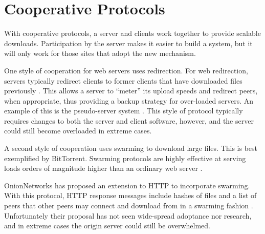 
\section{Cooperative Protocols}

With cooperative protocols, a server and clients work together to provide scalable downloads.  Participation by the server makes it easier to build a system,
but it will only work for those sites that adopt the new mechanism.  

One style of cooperation for web servers uses redirection.  For web redirection, servers typically redirect clients to former clients that have downloaded files previously \cite{pseudoserving, coopnet}.  This allows a server to ``meter'' its upload speeds and redirect peers, when appropriate, thus providing a backup strategy for over-loaded servers.  An example of this is the pseudo-server system \cite{pseudoserving}.  This style of protocol typically requires changes to both the server and client software, however, and the server could still become overloaded in extreme cases.

A second style of cooperation uses swarming to download large files.  This is best exemplified by BitTorrent.  Swarming protocols are highly effective at serving loads orders of magnitude higher than an ordinary web server \cite{zappala}.

OnionNetworks has proposed an extension to HTTP to incorporate swarming.  With this protocol, HTTP response messages include hashes of files and a list of peers that other peers 
may connect and download from in a swarming fashion \cite{onion}.  Unfortunately their proposal has not seen wide-spread adoptance nor research, and in extreme
cases the origin server could still be overwhelmed.

